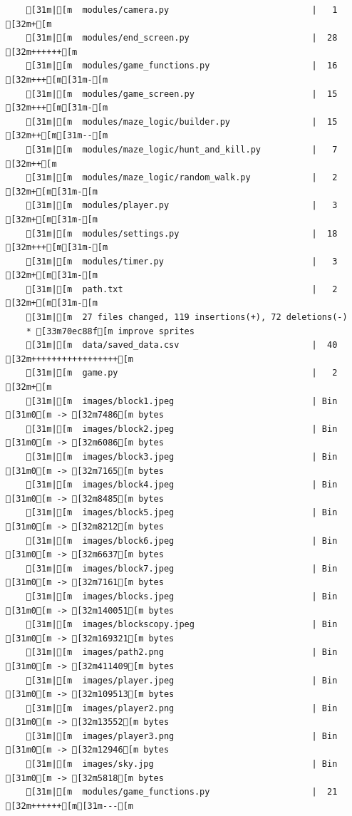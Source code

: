 \documentclass{article}
\begin{document}
{\begin{verbatim}
    [31m|[m  modules/camera.py                            |   1 [32m+[m
    [31m|[m  modules/end_screen.py                        |  28 [32m++++++[m
    [31m|[m  modules/game_functions.py                    |  16 [32m+++[m[31m-[m
    [31m|[m  modules/game_screen.py                       |  15 [32m+++[m[31m-[m
    [31m|[m  modules/maze_logic/builder.py                |  15 [32m++[m[31m--[m
    [31m|[m  modules/maze_logic/hunt_and_kill.py          |   7 [32m++[m
    [31m|[m  modules/maze_logic/random_walk.py            |   2 [32m+[m[31m-[m
    [31m|[m  modules/player.py                            |   3 [32m+[m[31m-[m
    [31m|[m  modules/settings.py                          |  18 [32m+++[m[31m-[m
    [31m|[m  modules/timer.py                             |   3 [32m+[m[31m-[m
    [31m|[m  path.txt                                     |   2 [32m+[m[31m-[m
    [31m|[m  27 files changed, 119 insertions(+), 72 deletions(-)
    * [33m70ec88f[m improve sprites
    [31m|[m  data/saved_data.csv                          |  40 [32m+++++++++++++++++[m
    [31m|[m  game.py                                      |   2 [32m+[m
    [31m|[m  images/block1.jpeg                           | Bin [31m0[m -> [32m7486[m bytes
    [31m|[m  images/block2.jpeg                           | Bin [31m0[m -> [32m6086[m bytes
    [31m|[m  images/block3.jpeg                           | Bin [31m0[m -> [32m7165[m bytes
    [31m|[m  images/block4.jpeg                           | Bin [31m0[m -> [32m8485[m bytes
    [31m|[m  images/block5.jpeg                           | Bin [31m0[m -> [32m8212[m bytes
    [31m|[m  images/block6.jpeg                           | Bin [31m0[m -> [32m6637[m bytes
    [31m|[m  images/block7.jpeg                           | Bin [31m0[m -> [32m7161[m bytes
    [31m|[m  images/blocks.jpeg                           | Bin [31m0[m -> [32m140051[m bytes
    [31m|[m  images/blockscopy.jpeg                       | Bin [31m0[m -> [32m169321[m bytes
    [31m|[m  images/path2.png                             | Bin [31m0[m -> [32m411409[m bytes
    [31m|[m  images/player.jpeg                           | Bin [31m0[m -> [32m109513[m bytes
    [31m|[m  images/player2.png                           | Bin [31m0[m -> [32m13552[m bytes
    [31m|[m  images/player3.png                           | Bin [31m0[m -> [32m12946[m bytes
    [31m|[m  images/sky.jpg                               | Bin [31m0[m -> [32m5818[m bytes
    [31m|[m  modules/game_functions.py                    |  21 [32m++++++[m[31m---[m

\end{verbatim}}
\end{document}
